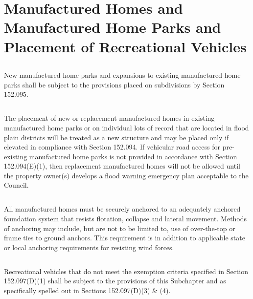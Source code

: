 \section{Manufactured Homes and Manufactured Home Parks and Placement of Recreational Vehicles}
\subsection{}
New manufactured home parks and expansions to existing manufactured home parks shall be subject to the provisions placed on subdivisions by Section 152.095.
\subsection{}
The placement of new or replacement manufactured homes in existing manufactured home parks or on individual lots of record that are located in flood plain districts will be treated as a new structure and may be placed only if elevated in compliance with Section 152.094. If vehicular road access for pre-existing manufactured home parks is not provided in accordance with Section 152.094(E)(1), then replacement manufactured homes will not be allowed until the property owner(s) develops a flood warning emergency plan acceptable to the Council.
\subsection{}
All manufactured homes must be securely anchored to an adequately anchored foundation system that resists flotation, collapse and lateral movement. Methods of anchoring may include, but are not to be limited to, use of over-the-top or frame ties to ground anchors. This requirement is in addition to applicable state or local anchoring requirements for resisting wind forces.
\subsection{}
Recreational vehicles that do not meet the exemption criteria specified in Section 152.097(D)(1) shall be subject to the provisions of this Subchapter and as specifically spelled out in Sections 152.097(D)(3) \& (4).
